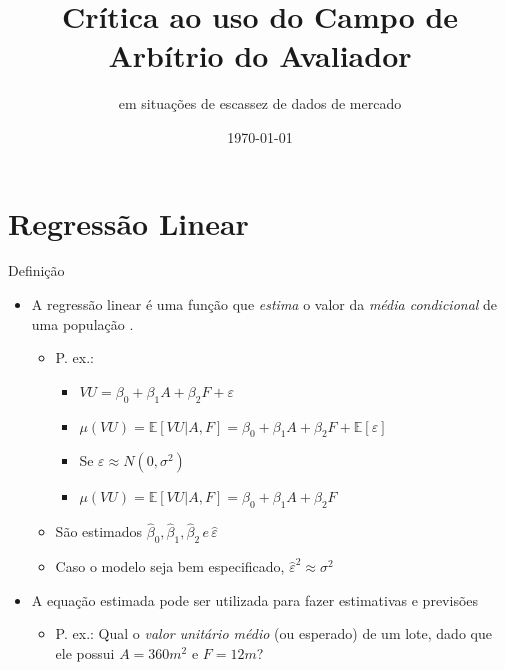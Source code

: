 \documentclass[9pt,ignorenonframetext,aspectratio=169]{beamer}
\title[]{Crítica ao uso do Campo de Arbítrio do Avaliador}
\subtitle{em situações de escassez de dados de mercado}
\author[
        Luiz Fernando Palin Droubi\footnote<.->{\href{mailto:lfpdroubi@gmail.com}{\nolinkurl{lfpdroubi@gmail.com}}}
\newline \and Carlos Augusto Zilli\footnote<.->{\href{mailto:carlos.zilli@ifsc.edu.br}{\nolinkurl{carlos.zilli@ifsc.edu.br}}}
\newline \and Willian Zonato\footnote<.->{\href{mailto:will.zonato@gmail.com}{\nolinkurl{will.zonato@gmail.com}}}
\newline \and Norberto Hochheim\footnote<.->{\href{mailto:norberto.hochheim@ufsc.br}{\nolinkurl{norberto.hochheim@ufsc.br}}}
    ]{Luiz Fernando Palin Droubi\footnote<.->{\href{mailto:lfpdroubi@gmail.com}{\nolinkurl{lfpdroubi@gmail.com}}}
\newline \and Carlos Augusto Zilli\footnote<.->{\href{mailto:carlos.zilli@ifsc.edu.br}{\nolinkurl{carlos.zilli@ifsc.edu.br}}}
\newline \and Willian Zonato\footnote<.->{\href{mailto:will.zonato@gmail.com}{\nolinkurl{will.zonato@gmail.com}}}
\newline \and Norberto Hochheim\footnote<.->{\href{mailto:norberto.hochheim@ufsc.br}{\nolinkurl{norberto.hochheim@ufsc.br}}}}
\institute[
    ]{
    GEAP - UFSC
    }
\date[
      \today
  ]{
      \today
        }
\providecommand{\tightlist}{%
  \setlength{\itemsep}{0pt}\setlength{\parskip}{0pt}}
\begin{document}
  \begin{frame}[plain]
  \titlepage
  \end{frame}


  \begin{frame}
  \tableofcontents[hideallsubsections]
  \end{frame}

\hypertarget{regressuxe3o-linear}{%
\section{Regressão Linear}\label{regressuxe3o-linear}}

\begin{frame}{Definição}
\protect\hypertarget{definiuxe7uxe3o}{}

\begin{itemize}[<+->]
\tightlist
\item
  A regressão linear é uma função que \emph{estima} o valor da
  \emph{média condicional} de uma população
  \autocite[10-11]{matloff2017}.

  \begin{itemize}[<+->]
  \tightlist
  \item
    P. ex.:

    \begin{itemize}[<+->]
    \tightlist
    \item
      \(VU = \beta_0 + \beta_1A + \beta_2F + \varepsilon\)
    \item
      \(\mu(VU) = \mathbb E [VU|A, F] = \beta_0 + \beta_1A + \beta_2F + \mathbb E[\varepsilon]\)
    \item
      Se \(\varepsilon \approx N(0, \sigma^2)\)
    \item
      \(\mu(VU) = \mathbb E [VU|A, F] = \beta_0 + \beta_1A + \beta_2F\)
    \end{itemize}
  \item
    São estimados
    \(\hat \beta_0, \hat \beta_1, \hat \beta_2 \,e\,\hat \varepsilon\)
  \item
    Caso o modelo seja bem especificado,
    \(\hat \varepsilon^2 \approx \sigma^2\)
  \end{itemize}
\item
  A equação estimada pode ser utilizada para fazer estimativas e
  previsões

  \begin{itemize}[<+->]
  \tightlist
  \item
    P. ex.: Qual o \emph{valor unitário médio} (ou esperado) de um lote,
    dado que ele possui \(A = 360m^2\) e \(F = 12m\)?


\end{itemize}
\end{itemize}
\end{frame}
\end{document}
